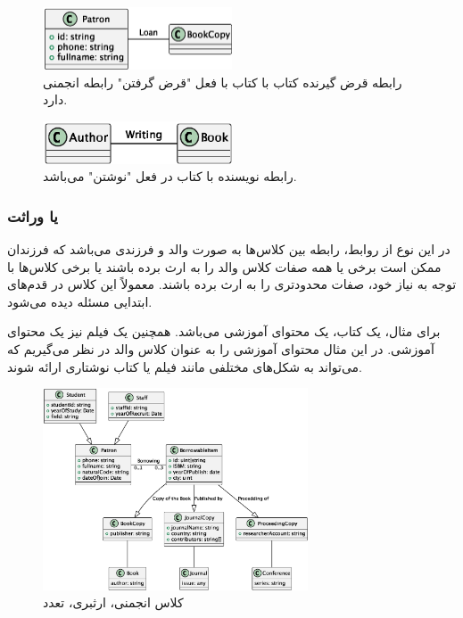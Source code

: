 \begin{figure}[h]
    \centering
    \includegraphics[width=0.5\textwidth]{assets/classes/patronbookcopy.eps}
    \caption{رابطه قرض گیرنده کتاب با کتاب با فعل "قرض گرفتن" رابطه انجمنی
    دارد.}
\end{figure}

\begin{figure}[H]
    \centering
    \includegraphics[width=0.5\textwidth]{assets/classes/bookAuthor.eps}
    \caption{رابطه نویسنده با کتاب در فعل "نوشتن" می‌باشد.}
\end{figure}

\subsubsection{ یا وراثت}

در این نوع از روابط، رابطه بین کلاس‌ها به صورت والد و فرزندی می‌باشد که فرزندان
ممکن است برخی یا همه صفات کلاس والد را به ارث برده باشند یا برخی کلاس‌ها با توجه
به نیاز خود، صفات محدودتری را به ارث برده باشند. معمولاً این کلاس در قدم‌های
ابتدایی مسئله دیده می‌شود.

برای مثال، یک کتاب، یک محتوای آموزشی می‌باشد. همچنین یک فیلم نیز یک محتوای
آموزشی. در این مثال محتوای آموزشی را به عنوان کلاس والد در نظر می‌گیریم که
می‌تواند به شکل‌های مختلفی مانند فیلم یا کتاب نوشتاری ارائه شوند.

\begin{figure}[H]
    \centering
    \includegraphics[width=0.7\textwidth]{assets/classes/secondInheritanceClass.eps}
    \caption{کلاس انجمنی، ارثبری، تعدد}
    \label{inheritanceWithMultiplicity}
\end{figure}

